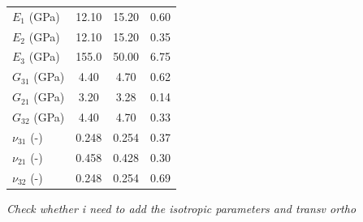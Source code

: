 \documentclass[review]{elsarticle}
\begin{document}
\begin{description}
\begin{table}
\begin{tabular}{l c c c }
\hline %

$E_{1}$ (GPa) & 12.10 & 15.20 & 0.60\\
$E_{2}$ (GPa) & 12.10 & 15.20 & 0.35\\
$E_{3}$ (GPa) & 155.0 & 50.00 & 6.75\\

$G_{31}$ (GPa) & 4.40 & 4.70 & 0.62\\
$G_{21}$ (GPa) & 3.20 & 3.28 & 0.14\\
$G_{32}$ (GPa) & 4.40 & 4.70 & 0.33\\

$\nu_{31}$ (-) & 0.248 & 0.254 & 0.37\\
$\nu_{21}$ (-) & 0.458 & 0.428 & 0.30\\
$\nu_{32}$ (-) & 0.248 & 0.254 & 0.69\\





\hline %
\end{tabular}
\label{table:nonlin} %
\end{table}
\end{description}


\it{\color{red}Check whether i need to add the isotropic parameters and transv
ortho}




\pagebreak


\end{document}
